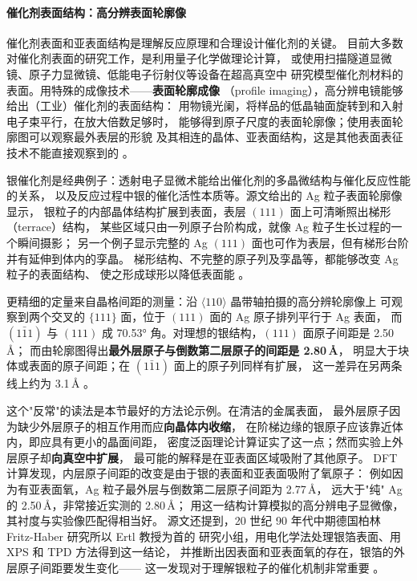 \paragraph{催化剂表面结构：高分辨表面轮廓像}
催化剂表面和亚表面结构是理解反应原理和合理设计催化剂的关键。
目前大多数对催化剂表面的研究工作，是利用量子化学做理论计算，
或使用扫描隧道显微镜、原子力显微镜、低能电子衍射仪等设备在超高真空中
研究模型催化剂材料的表面。用特殊的成像技术——\textbf{表面轮廓成像}
（profile imaging），高分辨电镜能够给出（工业）催化剂的表面结构：
用物镜光阑，将样品的低晶轴面旋转到和入射电子束平行，在放大倍数足够时，
能够得到原子尺度的表面轮廓像；使用表面轮廓图可以观察最外表层的形貌
及其相连的晶体、亚表面结构，这是其他表面表征技术不能直接观察到的
。

银催化剂是经典例子：透射电子显微术能给出催化剂的多晶微结构与催化反应性能的关系，
以及反应过程中银的催化活性本质等。源文给出的 Ag 粒子表面轮廓像显示，
银粒子的内部晶体结构扩展到表面，表层 $(111)$ 面上可清晰照出梯形（terrace）结构，
某些区域只由一列原子台阶构成，就像 Ag 粒子生长过程的一个瞬间摄影；
另一个例子显示完整的 Ag $(111)$ 面也可作为表层，但有梯形台阶并有延伸到体内的孪晶。
梯形结构、不完整的原子列及孪晶等，都能够改变 Ag 粒子的表面结构、
使之形成球形以降低表面能
。

更精细的定量来自晶格间距的测量：沿 $\langle 110\rangle$ 晶带轴拍摄的高分辨轮廓像上
可观察到两个交叉的 $\{111\}$ 面，位于 $(111)$ 面的 Ag 原子排列平行于 Ag 表面，
而 $(1\bar{1}1)$ 与 $(111)$ 成 70.53° 角。对理想的银结构，$(111)$ 面原子间距是 2.50\,Å；
而由轮廓图得出\textbf{最外层原子与倒数第二层原子的间距是 2.80\,Å}，
明显大于块体或表面的原子间距；在 $(1\bar{1}1)$ 面上的原子列同样有扩展，
这一差异在另两条线上约为 3.1\,Å
。

这个"反常"的读法是本节最好的方法论示例。在清洁的金属表面，
最外层原子因为缺少外层原子的相互作用而应\textbf{向晶体内收缩}，
在阶梯边缘的银原子应该靠近体内，即应具有更小的晶面间距，
密度泛函理论计算证实了这一点；然而实验上外层原子却\textbf{向真空中扩展}，
最可能的解释是在亚表面区域吸附了其他原子。
DFT 计算发现，内层原子间距的改变是由于银的表面和亚表面吸附了氧原子：
例如因为有亚表面氧，Ag 粒子最外层与倒数第二层原子间距为 2.77\,Å，
远大于"纯" Ag 的 2.50\,Å，非常接近实测的 2.80\,Å；
用这一结构计算模拟的高分辨电子显微像，其衬度与实验像匹配得相当好。
源文还提到，20 世纪 90 年代中期德国柏林 Fritz-Haber 研究所以 Ertl 教授为首的
研究小组，用电化学法处理银箔表面、用 XPS 和 TPD 方法得到这一结论，
并推断出因表面和亚表面氧的存在，银箔的外层原子间距要发生变化——
这一发现对于理解银粒子的催化机制非常重要
。


